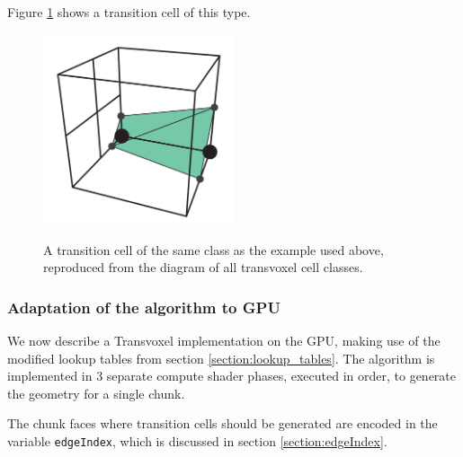 \documentclass[11pt]{article}
\begin{document}
Figure \ref{fig:transition_cell_example_case} shows a transition cell of this type.
\begin{figure}
  \caption{A transition cell of the same class as the example used above, reproduced from the diagram of all transvoxel cell classes\cite{lengyel}.}
  \includegraphics[width=0.5\textwidth]{transition_cell_example_case.PNG}
  \label{fig:transition_cell_example_case}
\end{figure}

\subsubsection{Adaptation of the algorithm to GPU}

We now describe a Transvoxel implementation on the GPU, making use of the modified lookup tables from section \ref{section:lookup_tables}. The algorithm is implemented in 3 separate compute shader phases, executed in order, to generate the geometry for a single chunk.

The chunk faces where transition cells should be generated are encoded in the variable \texttt{edgeIndex}, which is discussed in section \ref{section:edgeIndex}.
\end{document}
